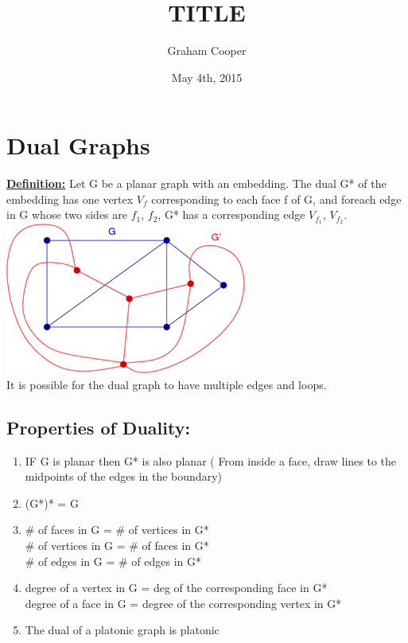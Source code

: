 \documentclass[12pt]{article}
\title{\vspace{-15ex}TITLE\vspace{-1ex}}
\date{May 4th, 2015}
\author{Graham Cooper}
\newcommand{\myt}[1]{\textbf{\underline{#1}}}
\begin{document}
	\maketitle
	
	\section*{Dual Graphs}
	\myt{Definition:} Let G be a planar graph with an embedding. The dual G* of the embedding has one vertex $V_f$ corresponding to each face f of G, and foreach edge in G whose two sides are $f_1$, $f_2$, G* has a corresponding edge $V_{f_1}$, $V_{f_2}$.\\
	\includegraphics[scale=0.5]{dual.png}\\
	
	It is possible for the dual graph to have multiple edges and loops.\\
	
	\subsection*{Properties of Duality:}
	\begin{enumerate}
		\item IF G is planar then G* is also planar ( From inside a face, draw lines to the midpoints of the edges in the boundary)
		\item (G*)* = G
		\item \# of faces in G = \# of vertices in G*\\
				\# of vertices in G = \# of faces in G*\\
				\# of edges in G = \# of edges in G*
		\item degree of a vertex in G = deg of the corresponding face in G*\\
		degree of a face in G = degree of the corresponding vertex in G*
		\item The dual of a platonic graph is platonic
	\end{enumerate}
	
\end{document}
